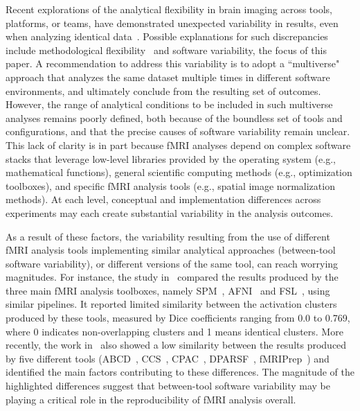 \documentclass[11pt,onecolumn]{article}
\begin{document}
Recent explorations of the analytical flexibility in brain imaging across
tools, platforms, or teams, have demonstrated unexpected variability in
results, even when analyzing identical data~\cite{botvinik2020variability}. Possible explanations for
such discrepancies include methodological flexibility~\cite{carp2012plurality} and software
variability, the focus of this paper. A recommendation to address this
variability is to adopt a ``multiverse" approach that analyzes the same
dataset multiple times in different software environments, and ultimately
conclude from the resulting set of outcomes. However, the range of
analytical conditions to be included in such multiverse analyses remains
poorly defined, both because of the boundless set of tools and
configurations, and that the precise causes of software variability remain
unclear. This lack of clarity is in part because fMRI analyses depend on
complex software stacks that leverage low-level libraries provided by the
operating system (e.g., mathematical functions), general scientific
computing methods (e.g., optimization toolboxes), and specific fMRI
analysis tools (e.g., spatial image normalization methods). At each level,
conceptual and implementation differences across experiments may each
create substantial variability in the analysis outcomes.

As a result of these factors, the variability resulting from the use of
different fMRI analysis tools implementing similar analytical approaches
(between-tool software variability), or different versions of the same tool,
 can reach worrying magnitudes. For instance, the
study in~\cite{bowring2019exploring} compared the results produced by the
three main fMRI analysis toolboxes, namely SPM~\cite{penny2011statistical},
AFNI~\cite{cox1996afni} and FSL~\cite{jenkinson2012fsl}, using similar
pipelines. It reported limited similarity between the activation clusters
produced by these tools, measured by Dice coefficients ranging from 0.0 to
0.769, where 0 indicates non-overlapping
clusters and 1 means identical clusters. More recently, the work
in~\cite{Li2021.12.01.470790} also showed a low similarity between the
results produced by five different tools (ABCD~\cite{feczko2021adolescent},
CCS~\cite{xu2015connectome}, CPAC~\cite{craddock2013towards}, DPARSF~\cite{yan2010dparsf},
fMRIPrep~\cite{esteban2019fmriprep}) and identified the main
factors contributing to these differences. The magnitude of the highlighted
differences suggest that between-tool software variability may be playing a critical
role in the reproducibility of fMRI analysis overall. 
\end{document}
